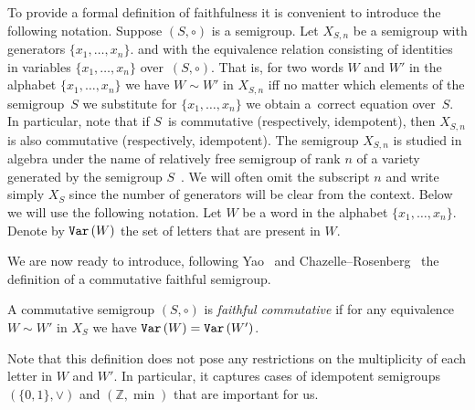 \documentclass{toc}
\begin{document}
To provide a formal definition of faithfulness it is convenient to introduce the
following notation. Suppose $(S, \circ)$ is a
semigroup. Let $X_{S,n}$ be a semigroup with generators $\{x_1,\ldots, x_n\}$.
and with the equivalence relation  %
consisting of identities in variables $\{x_1,\ldots, x_n\}$ over~$(S,\circ)$.
That is, for two words $W$ and $W'$ in
the alphabet $\{x_1,\ldots,x_n\}$ we have $W\sim W'$ in $X_{S,n}$ iff no matter
which elements of the semigroup~$S$ we substitute for $\{x_1,\ldots, x_n\}$ we
obtain a~correct equation over~$S$. In particular, note that if $S$~is
commutative (respectively, idempotent), then $X_{S,n}$ is also commutative
(respectively, idempotent).
The semigroup $X_{S,n}$ is studied in algebra under the name of relatively free
semigroup of rank $n$ of a variety generated by
the   %
semigroup
$S$~\cite{neumann2012varieties}. %
We will often omit the subscript $n$ and write
simply $X_S$ since the number of generators will be clear from the context.
Below we will use the following notation. Let $W$ be a word in the alphabet
$\{x_1,\ldots, x_n\}$. Denote by $\texttt{Var}\,(W)$ the set of letters that are present
in $W$.

We are now ready to introduce,
following Yao~\cite{DBLP:conf/stoc/Yao82} and
Chazelle--Rosenberg~\cite{DBLP:journals/ijcga/ChazelleR91}  %
the definition of a commutative faithful semigroup.

\begin{definition}[Yao, Chazelle--Rosenberg]  %
\label{def:faithfulcommutative}
A commutative semigroup $(S, \circ)$ is \emph{faithful commutative} if for any
equivalence $W\sim W'$ in $X_S$ we have $\texttt{Var}\,(W)=\texttt{Var}\,(W')$.
\end{definition}


Note that this definition does not pose any restrictions on the 
multiplicity
of
each letter %
in $W$ and $W'$. In particular, it captures cases of idempotent semigroups
$(\{0,1\}, \vee)$ and $(\mathbb{Z},\min)$ that are important for us.
\end{document}
